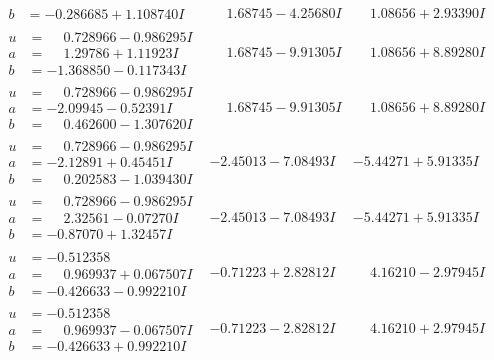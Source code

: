 \documentclass[1p]{elsarticle_modified}
\theoremstyle{definition}
\begin{document}
$$\begin{array}{c|c|c}
\begin{aligned}
b &= -0.286685 + 1.108740 I\end{aligned}
 & \phantom{-}1.68745 - 4.25680 I & \phantom{-}1.08656 + 2.93390 I \\ \hline\begin{aligned}
u &= \phantom{-}0.728966 - 0.986295 I \\
a &= \phantom{-}1.29786 + 1.11923 I \\
b &= -1.368850 - 0.117343 I\end{aligned}
 & \phantom{-}1.68745 - 9.91305 I & \phantom{-}1.08656 + 8.89280 I \\ \hline\begin{aligned}
u &= \phantom{-}0.728966 - 0.986295 I \\
a &= -2.09945 - 0.52391 I \\
b &= \phantom{-}0.462600 - 1.307620 I\end{aligned}
 & \phantom{-}1.68745 - 9.91305 I & \phantom{-}1.08656 + 8.89280 I \\ \hline\begin{aligned}
u &= \phantom{-}0.728966 - 0.986295 I \\
a &= -2.12891 + 0.45451 I \\
b &= \phantom{-}0.202583 - 1.039430 I\end{aligned}
 & -2.45013 - 7.08493 I & -5.44271 + 5.91335 I \\ \hline\begin{aligned}
u &= \phantom{-}0.728966 - 0.986295 I \\
a &= \phantom{-}2.32561 - 0.07270 I \\
b &= -0.87070 + 1.32457 I\end{aligned}
 & -2.45013 - 7.08493 I & -5.44271 + 5.91335 I \\ \hline\begin{aligned}
u &= -0.512358\phantom{ +0.000000I} \\
a &= \phantom{-}0.969937 + 0.067507 I \\
b &= -0.426633 - 0.992210 I\end{aligned}
 & -0.71223 + 2.82812 I & \phantom{-}4.16210 - 2.97945 I \\ \hline\begin{aligned}
u &= -0.512358\phantom{ +0.000000I} \\
a &= \phantom{-}0.969937 - 0.067507 I \\
b &= -0.426633 + 0.992210 I\end{aligned}
 & -0.71223 - 2.82812 I & \phantom{-}4.16210 + 2.97945 I\\

\end{array}$$
\end{document}
